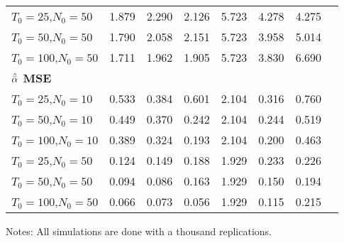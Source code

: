 \documentclass{article}
\begin{document}
\begin{table}[t]
{\begin{threeparttable}
\begin{tabular}{l c*{6}{c}}
$T_0 = 25$,$N_0 = 50$   & 1.879 & 2.290 & 2.126 & 5.723 & 4.278 & 4.275\\
$T_0 = 50$,$N_0 = 50$  & 1.790 & 2.058 & 2.151 & 5.723 & 3.958 & 5.014\\
$T_0 = 100$,$N_0 = 50$  & 1.711 & 1.962 & 1.905 & 5.723 & 3.830 & 6.690\\

\hline 
\multicolumn{5}{l}{\textbf{$\hat{\Bar{\alpha}}$ MSE}} \\                                 \midrule
$T_0 = 25$,$N_0 = 10$ & 0.533 & 0.384  & 0.601  &  2.104 & 0.316 & 0.760 \\
$T_0 = 50$,$N_0 = 10$  & 0.449 & 0.370 & 0.242 &  2.104 & 0.244 & 0.519 \\
$T_0 = 100$,$N_0 = 10$  & 0.389 & 0.324 & 0.193 & 2.104 & 0.200 & 0.463 \\

$T_0 = 25$,$N_0 = 50$ & 0.124 & 0.149 & 0.188 & 1.929 & 0.233 & 0.226\\
$T_0 = 50$,$N_0 = 50$  & 0.094 & 0.086  & 0.163  & 1.929 & 0.150 & 0.194\\
$T_0 = 100$,$N_0 = 50$  & 0.066 & 0.073  & 0.056 & 1.929 & 0.115 & 0.215\\


\hline
\end{tabular}
\begin{tablenotes}
      \small
      \item Notes: All simulations are done with a thousand replications.
\end{tablenotes}
    \end{threeparttable}}
\end{table}
\end{document}

